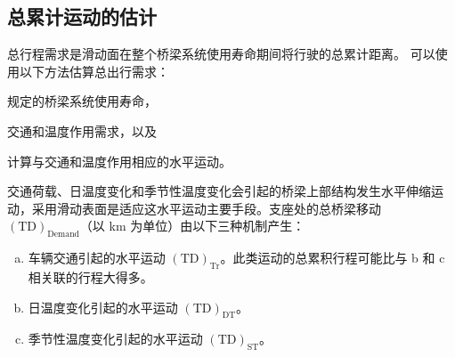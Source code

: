 \subsection{总累计运动的估计}
\label{subsec:estimate-total-movements}
总行程需求是滑动面在整个桥梁系统使用寿命期间将行驶的总累计距离。 可以使用以下方法估算总出行需求：
\begin{enumerate*}[a)]
  \item 规定的桥梁系统使用寿命，
  \item 交通和温度作用需求，以及
  \item 计算与交通和温度作用相应的水平运动。
\end{enumerate*}

交通荷载、日温度变化和季节性温度变化会引起的桥梁上部结构发生水平伸缩运动，采用滑动表面是适应这水平运动主要手段。支座处的总桥梁移动 $(\text{TD})_\text{Demand}$（以 \unit{km} 为单位）由以下三种机制产生：
\begin{enumerate}[a.]
  \item 车辆交通引起的水平运动 $(\text{TD})_\text{Tr}$。此类运动的总累积行程可能比与 b 和 c 相关联的行程大得多。
  \item 日温度变化引起的水平运动 $(\text{TD})_\text{DT}$。
  \item 季节性温度变化引起的水平运动 $(\text{TD})_\text{ST}$。
\end{enumerate}

